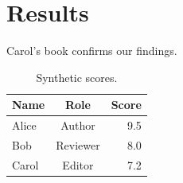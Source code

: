 \documentclass[11pt,a4paper]{article}
\begin{document}
\section{Results}\label{sec:results}
Carol's book \cite{carol2024editors} confirms our findings.

\begin{table}[h]
  \centering
  \begin{tabular}{lcr}
    \hline
    Name  & Role     & Score \\
    \hline
    Alice & Author   & 9.5   \\
    Bob   & Reviewer & 8.0   \\
    Carol & Editor   & 7.2   \\
    \hline
  \end{tabular}
  \caption{Synthetic scores.}\label{tab:scores}
\end{table}

\printbibliography
\end{document}
